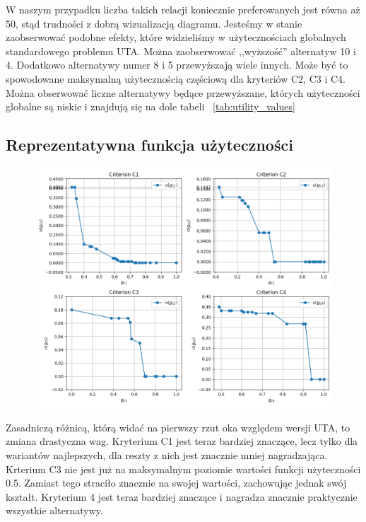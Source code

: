 \documentclass[11pt]{article}
\begin{document}
W naszym przypadku liczba takich relacji koniecznie preferowanych jest równa aż 50, stąd trudności z dobrą wizualizacją diagramu. Jesteśmy w stanie zaobserwować podobne efekty, które widzieliśmy w użytecznościach globalnych standardowego problemu UTA. Można zaobserwować ,,wyższość'' alternatyw 10 i 4. Dodatkowo alternatywy numer 8 i 5 przewyższają wiele innych. Może być to spowodowane maksymalną użytecznością częściową dla kryteriów C2, C3 i C4. Można obserwować liczne alternatywy będące przewyższane, których użyteczności globalne są niskie i znajdują się na dole tabeli ~\ref{tab:utility_values}

\subsection{Reprezentatywna funkcja użyteczności}
\begin{figure}[H]
	\centering
	\includegraphics[scale=0.6]{representative_function.png}
\end{figure}
Zasadniczą różnicą, którą widać na pierwszy rzut oka względem wersji UTA, to zmiana drastyczna wag. Kryterium C1 jest teraz bardziej znaczące, lecz tylko dla wariantów najlepszych, dla reszty z nich jest znacznie mniej nagradzająca. Krterium C3 nie jest już na maksymalnym poziomie wartości funkcji użyteczności 0.5. Zamiast tego straciło znacznie na swojej wartości, zachowując jednak swój kształt. Kryterium 4 jest teraz bardziej znaczące i nagradza znacznie praktycznie wszystkie alternatywy.
\end{document}
